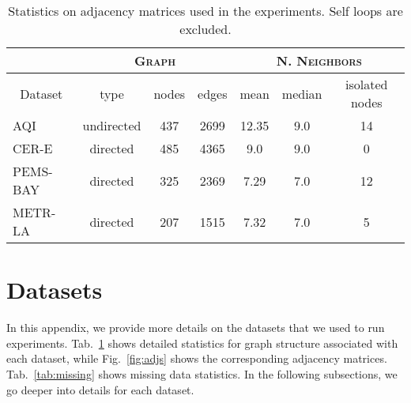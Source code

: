 \documentclass{article} \usepackage{iclr2022_conference,times}
\begin{document}
\begin{table}[ht]
\caption{Statistics on adjacency matrices used in the experiments. Self loops are excluded.}
\vspace{0.1cm}
\centering
\begin{tabular}{ l | c c c | c c c}
\toprule
 \multicolumn{1}{c}{}&\multicolumn{3}{c}{\textsc{Graph}} & \multicolumn{3}{c}{\textsc{N. Neighbors}} \\
\midrule
\multicolumn{1}{c|}{Dataset} & type & nodes & edges & mean & median & isolated nodes\\
\midrule
AQI & undirected & 437 & 2699 & 12.35 & 9.0 & 14 \\
CER-E & directed & 485 & 4365 & 9.0 & 9.0 & 0 \\
PEMS-BAY & directed & 325 & 2369 & 7.29 & 7.0 & 12 \\
METR-LA & directed & 207 & 1515 & 7.32 & 7.0 & 5\\
\bottomrule
\end{tabular}
\label{t:adj}
\end{table} 
\section{Datasets}

In this appendix, we provide more details on the datasets that we used to run experiments. Tab.~\ref{t:adj} shows detailed statistics for graph structure associated with each dataset, while Fig.~\ref{fig:adjs} shows the corresponding adjacency matrices. Tab.~\ref{tab:missing} shows missing data statistics. In the following subsections, we go deeper into details for each dataset.
\end{document}
